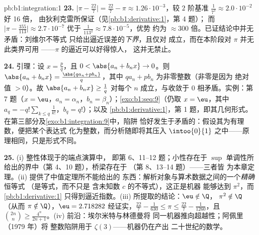 \begin{solution}{pb:b1:integration:1}
\textbf{23.} $\bigl|\pi - \frac{22}{7}\bigr| = \frac{22}{7} -
\pi \approx 1.26\cdot10^{-3}$，较
$2$ 阶基准 $\frac{1}{7^2} \approx 2.0\cdot10^{-2}$ 好 16 倍，
由狄利克雷所保证（见\cref{pb:b1:derivative:1}，第 4 题）；
而 $\bigl|\pi - \frac{355}{113}\bigr| \approx 2.7\cdot10^{-7}$
优于 $\frac{1}{113^2} \approx 7.8\cdot10^{-5}$，优势
约为 $\approx 300$ 倍。已证结论中并无矛盾：刘维尔不等式
只给出逼近误差的\emph{下界}，且仅对
成立，而在本阶段对 $\pi$ 并无此类界可用
——$\pi$ 的逼近可以好得惊人，
这并无禁止。

\textbf{24.} 引理：设 $x = \frac pq$，且 $0 < \abs{a_n +
b_n x} \to 0$。则 $\abs{a_n + b_n x} = \frac{\abs{q a_n + p
b_n}}{q}$，其中 $q a_n + p b_n$ 为非零整数（非零是因为
绝对值 $> 0$）。故 $\abs{a_n + b_n x}
\geq \frac1q$ 对每个 $n$ 成立，与收敛于
$0$ 相矛盾。实例：第 7 题（$x = \eu$，$a_n = \alpha_n$，$b_n =
\beta_n$）；\cref{exo:b1:seq:9}（仍取 $x = \eu$，其中 $a_q =
-q!\sum_{k \leq q}\frac{1}{k!}$，$b_q = q!$）；以及
\cref{pb:b1:derivative:1}，第 1 题，即其几何形式。
在第三部分及\cref{exo:b1:integration:9}中，陷阱
恰好发生于矛盾的\emph{}：假设其为有理数，便把某个表达式
化为整数，而分析随即将其压入
$\intoo{0}{1}$ 之中——原理相同，只是形式不同。

\textbf{25.} (i) 整性体现于的端点演算中，
即第 6、11--12 题；小性存在于
$\sup$ 单调性所给出的界中（第 4、10 题），桥梁存在于
（第 8、13--14 题）——三者皆
为本章定理。(ii) 提供了中值定理所不能给出的
东西：解析对象与算术数据之间的一个\emph{精确}恒等式
（是等式，而不只是
含未知数 $c$ 的不等式），这正是机器
能够达到 $\pi^2$，而\cref{pb:b1:derivative:1}
只得到逼近指数。(iii) 所提取的结论：$\eu \notin \Q$，
$\pi^2 \notin \Q$（从而 $\pi \notin \Q$），$\eu = 2.718282$
经证实，$\frac{22}{7} - \frac{1}{630} \leq \pi \leq
\frac{22}{7} - \frac{1}{1260}$，且 $\binom{2n}{n} \geq
\frac{4^n}{2n+1}$。(iv) 前沿：埃尔米特与林德曼将
同一机器推向超越性；阿佩里（1979 年）将
整数陷阱用于 $\zeta(3)$——机器仍在产出
二十世纪的数学。
\end{solution}
